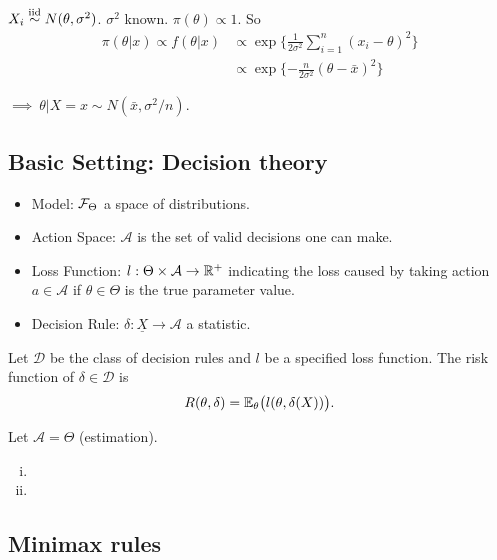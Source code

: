 \begin{exap}
	$X_i \stackrel{\text{iid}}{\sim} N(\theta, \sigma^2)$. $\sigma^2$ known. $\pi(\theta)\propto 1$. So 
	\begin{align*}
		\pi(\theta|x) \propto f(\theta|x) & \propto \exp\{ \frac{1}{2\sigma^2} \sum_{i=1}^n(x_i - \theta)^2 \}\\
		&\propto \exp\{ -\frac{n}{2\sigma^2}(\theta - \bar{x})^2 \}
	\end{align*}
	
	$\implies \ \theta|X=x \sim N(\bar{x}, \sigma^2/n)$.
\end{exap}

\subsection{Basic Setting: Decision theory}
\begin{mydef}\textbf{ }
	\begin{itemize}
		\item Model: $\mathcal{F}_\Theta$ a space of distributions.
		\item Action Space: $\mathcal{A}$ is the set of valid decisions one can make.
		\item Loss Function: $l:\Theta\times \mathcal{A} \to \mathbb{R}^+$ indicating the loss caused by taking action $a\in\mathcal{A}$ if $\theta\in \Theta$ is the true parameter value.
		\item Decision Rule: $\delta: \underline{X}\to \mathcal{A}$ a statistic.
	\end{itemize}
\end{mydef}

\begin{mydef}
	Let $\mathcal{D}$ be the class of decision rules and $l$ be a specified loss function. The risk function of $\delta\in \mathcal{D}$ is 
	$$R(\theta, \delta) = \mathbb{E}_\theta \big( l(\theta, \delta(X)) \big).$$ 
\end{mydef}

\begin{exap}
	Let $\mathcal{A} = \Theta$ (estimation).
	
	\begin{enumerate}[i)]
		\item
		
		\item 
	\end{enumerate}
\end{exap}

\subsection{Minimax rules}

